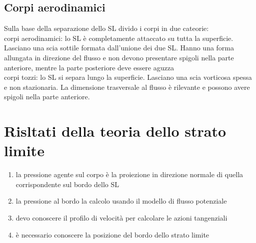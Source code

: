 \documentclass[11pt,a4paper]{report}
\begin{document}
{		\subsection{Corpi aerodinamici}
		Sulla base della separazione dello SL divido i corpi in due cateorie:\\
		corpi aerodinamici: lo SL è completamente attaccato su tutta la superficie. Lasciano una scia sottile formata dall'unione dei due SL. Hanno una forma allungata in direzione del flusso e non devono presentare spigoli nella parte anteriore, mentre la parte posteriore deve essere aguzza\\
		corpi tozzi: lo SL si separa lungo la superficie. Lasciano una scia vorticosa spessa e non stazionaria. La dimensione trasversale al flusso è rilevante e possono avere spigoli nella parte anteriore. 
		
	\section{Risltati della teoria dello strato limite}
	\begin{enumerate}
		\item{la pressione agente sul corpo è la proiezione in direzione normale di quella corrispondente sul bordo dello SL}
		\item{la pressione al bordo la calcolo usando il modello di flusso potenziale}
		\item{devo conoscere il profilo di velocità per calcolare le azioni tangenziali}
		\item{è necessario conoscere la posizione del bordo dello strato limite}
	\end{enumerate}
	
}
\end{document}
